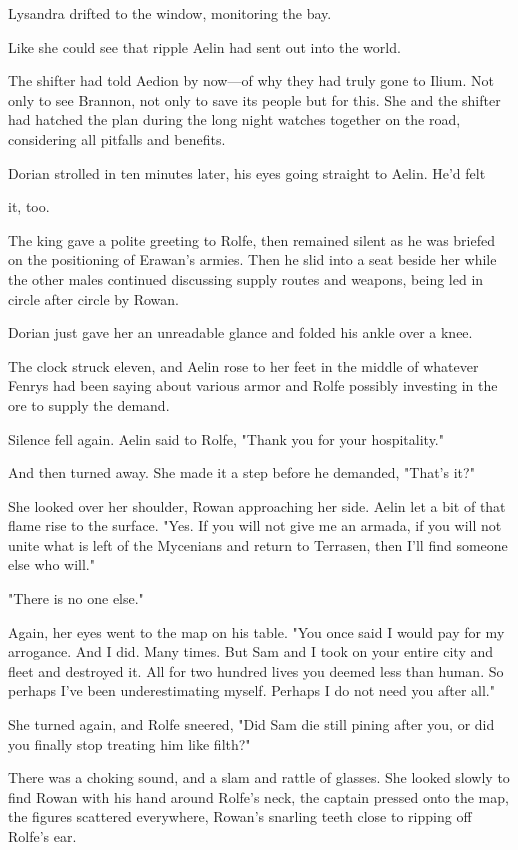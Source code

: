 Lysandra drifted to the window, monitoring the bay.

Like she could see that ripple Aelin had sent out into the world.

The shifter had told Aedion by now---of why they had truly gone to Ilium. Not only to see Brannon, not only to save its people  but for this. She and the shifter had hatched the plan during the long night watches together on the road, considering all pitfalls and benefits.

Dorian strolled in ten minutes later, his eyes going straight to Aelin. He'd felt

it, too.

The king gave a polite greeting to Rolfe, then remained silent as he was briefed on the positioning of Erawan's armies. Then he slid into a seat beside her while the other males continued discussing supply routes and weapons, being led in circle after circle by Rowan.

Dorian just gave her an unreadable glance and folded his ankle over a knee.

The clock struck eleven, and Aelin rose to her feet in the middle of whatever Fenrys had been saying about various armor and Rolfe possibly investing in the ore to supply the demand.

Silence fell again. Aelin said to Rolfe, "Thank you for your hospitality."

And then turned away. She made it a step before he demanded, "That's it?"

She looked over her shoulder, Rowan approaching her side. Aelin let a bit of that flame rise to the surface. "Yes. If you will not give me an armada, if you will not unite what is left of the Mycenians and return to Terrasen, then I'll find someone else who will."

"There is no one else."

Again, her eyes went to the map on his table. "You once said I would pay for my arrogance. And I did. Many times. But Sam and I took on your entire city and fleet and destroyed it. All for two hundred lives you deemed less than human. So perhaps I've been underestimating myself. Perhaps I do not need you after all."

She turned again, and Rolfe sneered, "Did Sam die still pining after you, or did you finally stop treating him like filth?"

There was a choking sound, and a slam and rattle of glasses. She looked slowly to find Rowan with his hand around Rolfe's neck, the captain pressed onto the map, the figures scattered everywhere, Rowan's snarling teeth close to ripping off Rolfe's ear.

